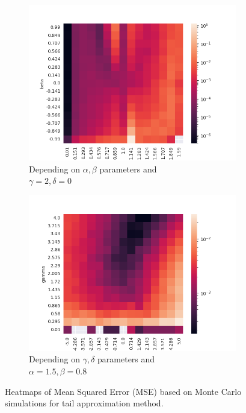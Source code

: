 \documentclass{article}
\begin{document}
		\begin{figure}[H]
			\begin{subfigure}{.5\textwidth}
				\centering
				\includegraphics[width=1\linewidth]{images/heatmap_cdf_MSE_alpha_beta.png}
				\caption{Depending on $\alpha, \beta$ parameters and \\$\gamma = 2, \delta = 0$}
			\end{subfigure}
			\begin{subfigure}[r]{.5\textwidth}
				\centering
				\includegraphics[width=1\linewidth]{images/heatmap_cdf_MSE_gamma_delta.png}
				\caption{Depending on $\gamma, \delta$ parameters and \\$\alpha = 1.5, \beta = 0.8$}
			\end{subfigure}
			\caption{Heatmaps of Mean Squared Error (MSE) based on Monte Carlo simulations for tail approximation method.}\label{heat1}
		\end{figure}
	
\end{document}
